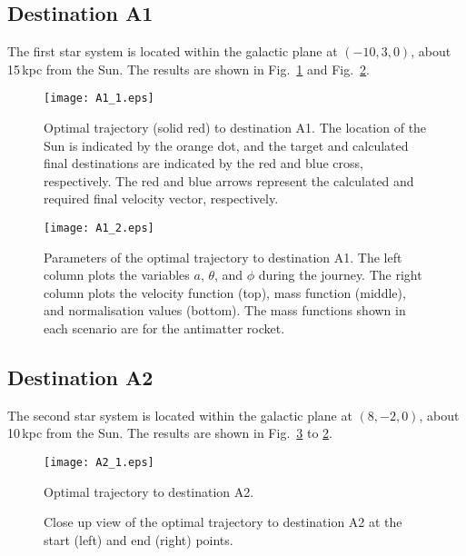 \documentclass[review]{elsarticle}
\begin{document}
\subsection{Destination A1}

The first star system is located within the galactic plane at $(-10,3,0)$, about 15\,kpc from the Sun. The results are shown in Fig.~\ref{A1_1} and Fig.~\ref{A1_2}.

\begin{figure}[h!]
\centering
\texttt{[image: A1\_1.eps]}
\caption{Optimal trajectory (solid red) to destination A1. The location of the Sun is indicated by the orange dot, and the target and calculated final destinations are indicated by the red and blue cross, respectively. The red and blue arrows represent the calculated and required final velocity vector, respectively.}
\label{A1_1}
\end{figure}

\begin{figure}[h!]
\centering
\texttt{[image: A1\_2.eps]}
\caption{Parameters of the optimal trajectory to destination A1.  The left column plots the variables $a$, $\theta$, and $\phi$ during the journey. The right column plots the velocity function (top), mass function (middle), and normalisation values (bottom). The mass functions shown in each scenario are for the antimatter rocket.}
\label{A1_2}
\end{figure}

\subsection{Destination A2}
The second star system is located within the galactic plane at $(8,-2,0)$, about 10\,kpc from the Sun. The results are shown in Fig.~\ref{A2_1} to \ref{A1_2}.

\begin{figure}[h!]
\centering
\texttt{[image: A2\_1.eps]}
\caption{Optimal trajectory to destination A2.}
\label{A2_1}
\end{figure}

\begin{figure}[h!]
\centering
{}
\caption{Close up view of the optimal trajectory to destination A2 at the start (left) and end (right) points.}
\label{A3}
\end{figure}
\end{document}
